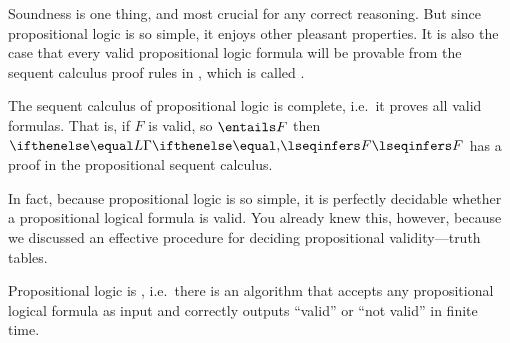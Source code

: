 \documentclass[11pt,twoside]{scrartcl}
\newcommand{\asfml}{F}
\begin{document}
Soundness is one thing, and most crucial for any correct reasoning.
But since propositional logic is so simple, it enjoys other pleasant properties.
It is also the case that every valid propositional logic formula will be provable from the sequent calculus proof rules in , which is called .

\begin{theorem}
  The sequent calculus of propositional logic is complete, i.e.\ it proves all valid formulas.
  That is, if $\asfml$ is valid, so \(\entails \asfml\) then \(\lsequent{}{\asfml}\) has a proof in the propositional sequent calculus.
\end{theorem}

In fact, because propositional logic is so simple, it is perfectly decidable whether a propositional logical formula is valid. You already knew this, however, because we discussed an effective procedure for deciding propositional validity---truth tables.

\begin{theorem}
  Propositional logic is , i.e.\ there is an algorithm that accepts any propositional logical formula as input and correctly outputs ``valid'' or ``not valid'' in finite time.
\end{theorem}





\end{document}
